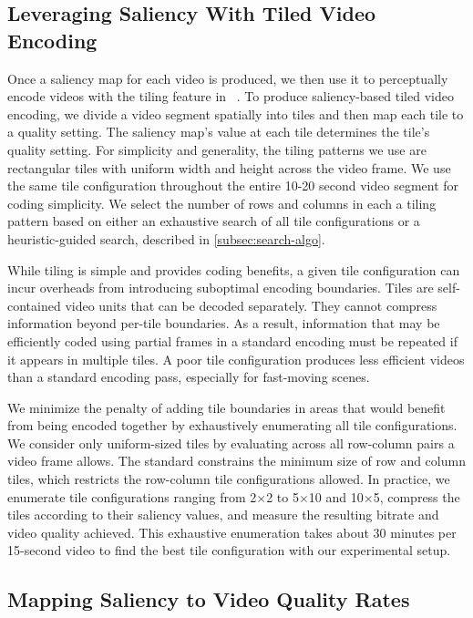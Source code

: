 \subsection{Leveraging Saliency With Tiled Video Encoding}
\label{subsec:tiles}

Once a saliency map for each video is produced, we then use it to perceptually encode videos with the tiling feature in \hevc~\cite{hevc}.
To produce saliency-based tiled video encoding, we divide a video segment spatially into tiles and then map each tile to a quality setting.
The saliency map's value at each tile determines the tile's quality setting.
For simplicity and generality, the tiling patterns we use are rectangular tiles with uniform width and height across the video frame.
We use the same tile configuration throughout the entire 10-20 second video segment for coding simplicity.
We select the number of rows and columns in each a tiling pattern based on either an exhaustive search of all tile configurations or a heuristic-guided search, described in \ref{subsec:search-algo}.

While tiling is simple and provides coding benefits, a given tile configuration can incur overheads from introducing suboptimal encoding boundaries.
Tiles are self-contained video units that can be decoded separately.
They cannot compress information beyond per-tile boundaries.
As a result, information that may be efficiently coded using partial frames in a standard encoding must be repeated if it appears in multiple tiles.
A poor tile configuration produces less efficient videos than a standard encoding pass, especially for fast-moving scenes.

We minimize the penalty of adding tile boundaries in areas that would benefit from being encoded together by exhaustively enumerating all tile configurations.
We consider only uniform-sized tiles by evaluating across all row-column pairs a video frame allows.
The \hevc standard constrains the minimum size of row and column tiles, which restricts the row-column tile configurations allowed.
In practice, we enumerate tile configurations ranging from 2$\times$2 to 5$\times$10 and 10$\times$5, compress the tiles according to their saliency values, and measure the resulting bitrate and video quality achieved.
This exhaustive enumeration takes about 30 minutes per 15-second video to find the best tile configuration with our experimental setup.

\saliencyTilesOverviewFigure

\subsection{Mapping Saliency to Video Quality Rates}
\label{subsec:mapping}

